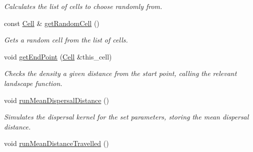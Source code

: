 \begin{DoxyCompactItemize}
\begin{DoxyCompactList}\small\item\em Calculates the list of cells to choose randomly from. \end{DoxyCompactList}\item 
const \hyperlink{struct_cell}{Cell} \& \hyperlink{class_simulate_dispersal_a7d0a2b28dd8d45f1b8a74dbcd82290e7}{get\+Random\+Cell} ()
\begin{DoxyCompactList}\small\item\em Gets a random cell from the list of cells. \end{DoxyCompactList}\item 
void \hyperlink{class_simulate_dispersal_a5069adc35fba116716bebd288dd9e65f}{get\+End\+Point} (\hyperlink{struct_cell}{Cell} \&this\+\_\+cell)
\begin{DoxyCompactList}\small\item\em Checks the density a given distance from the start point, calling the relevant landscape function. \end{DoxyCompactList}\item 
void \hyperlink{class_simulate_dispersal_a4a759f6bb3b8288345eaf7c0d66ad29e}{run\+Mean\+Dispersal\+Distance} ()\hypertarget{class_simulate_dispersal_a4a759f6bb3b8288345eaf7c0d66ad29e}{}\label{class_simulate_dispersal_a4a759f6bb3b8288345eaf7c0d66ad29e}

\begin{DoxyCompactList}\small\item\em Simulates the dispersal kernel for the set parameters, storing the mean dispersal distance. \end{DoxyCompactList}\item 
void \hyperlink{class_simulate_dispersal_a406514e917874907cfb7a8d6c7889098}{run\+Mean\+Distance\+Travelled} ()\hypertarget{class_simulate_dispersal_a406514e917874907cfb7a8d6c7889098}{}\label{class_simulate_dispersal_a406514e917874907cfb7a8d6c7889098}


\end{DoxyCompactItemize}
